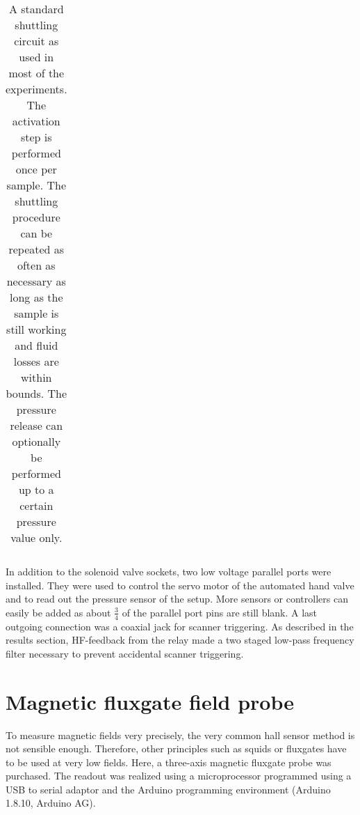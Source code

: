 \begin{table}
\begin{tabular}{| l | c | cccc | ccc | r |}
                    \hline 
                \end{tabular}
                \caption[15N hyperpolarization steps]{A standard shuttling circuit as used in most of the experiments. The activation step is performed once per sample. The shuttling procedure can be repeated as often as necessary as long as the sample is still working and fluid losses are within bounds. The pressure release can optionally be performed up to a certain pressure value only.}
                \label{table:matMeth:shuttlingCycle}
            \end{table}
            In addition to the solenoid valve sockets, two low voltage parallel ports were installed.  They were used to control the servo motor of the automated hand valve and to read out the pressure sensor of the setup. More sensors or controllers can easily be added as about $\frac{3}{4}$ of the parallel port pins are still blank.
            A last outgoing connection was a coaxial jack for scanner triggering.  As described in the results section, HF-feedback from the relay made a two staged low-pass frequency filter necessary to prevent accidental scanner triggering.
    \section{Magnetic fluxgate field probe}\label{sec:methodsfluxgate}
    To measure magnetic fields very precisely, the very common hall sensor method is not sensible enough. Therefore, other principles such as squids or fluxgates have to be used at very low fields. Here, a three-axis magnetic fluxgate probe was purchased. The readout was realized using a microprocessor programmed using a USB to serial adaptor and the Arduino programming environment (Arduino 1.8.10, Arduino AG).
